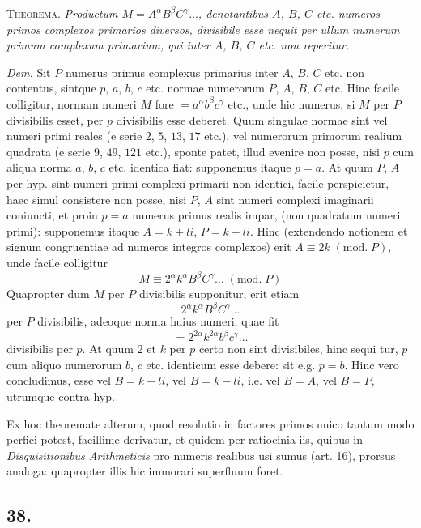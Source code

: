 \documentclass[twoside,12pt]{memoir}
\renewcommand{\pmod}[1]{\;(\textrm{mod.}\;#1)}
\begin{document}
\textsc{Theorema.} \textit{Productum \(M=A^{\alpha} B^{\beta} C^{\gamma} \ldots\), denotantibus \(A\), \(B\), \(C\) etc. numeros primos complexos primarios diversos, divisibile esse nequit per ullum numerum primum complexum primarium, qui inter \(A\), \(B\), \(C\) etc. non reperitur.}
 
\textit{Dem.} Sit \(P\) numerus primus complexus primarius inter \(A\), \(B\), \(C\) etc. non contentus, sintque \(p\), \(a\), \(b\), \(c\) etc. normae numerorum \(P\), \(A\), \(B\), \(C\) etc. Hinc facile colligitur, normam numeri \(M\) fore \(=a^{\alpha} b^{\beta} c^{\gamma}\) etc., unde hic numerus, si \(M\) per \({P}\) divisibilis esset, per \(p\) divisibilis esse deberet. Quum singulae normae sint vel numeri primi reales (e serie \(2\), \(5\), \(13\), \(17\) etc.), vel numerorum primorum realium quadrata (e serie \(9\), \(49\), \(121\) etc.), sponte patet, illud evenire non posse, nisi \(p\) cum aliqua norma \(a\), \(b\), \(c\) etc. identica fiat: supponemus itaque \(p=a\). At quum \(P\), \(A\) per hyp. sint numeri primi complexi primarii non identici, facile perspicietur, haec simul consistere non posse, nisi \(P\), \(A\) sint numeri complexi imaginarii coniuncti, et proin \(p=a\) numerus primus realis impar, (non quadratum numeri primi): supponemus itaque \(A=k+l i\), \(P=k-l i\). Hinc (extendendo notionem et signum congruentiae ad numeros integros complexos) erit \(A \equiv 2 k\pmod{P}\), unde facile colligitur
\[M \equiv 2^{\alpha} k^{\alpha} B^{\beta} C^{\gamma} \ldots\pmod{P}\]
Quapropter dum \(M\) per \(P\) divisibilis supponitur, erit etiam
\[2^{\alpha} k^{\alpha} B^{\beta} C^{\gamma} \ldots\]
per \(P\) divisibilis, adeoque norma huius numeri, quae fit
\[=2^{2 \alpha} k^{2 \alpha} b^{\beta} c^{\gamma} \ldots\]
divisibilis per \(p\). At quum 2 et \(k\) per \(p\) certo non sint divisibiles, hinc sequi\pagebreak%
tur, \(p\) cum aliquo numerorum \(b\), \(c\) etc. identicum esse debere: sit e.g. \(p=b\). Hinc vero concludimus, esse vel \(B=k+l i\), vel \(B=k-l i\), i.e. vel \(B=A\), vel \(B=P\), utrumque contra hyp.
 
Ex hoc theoremate alterum, quod resolutio in factores primos unico tantum modo perfici potest, facillime derivatur, et quidem per ratiocinia iis, quibus in \textit{Disquisitionibus Arithmeticis} pro numeris realibus usi sumus (art. 16), prorsus analoga: quapropter illis hic immorari superfluum foret.

\subsection*{38.}
 
\end{document}
